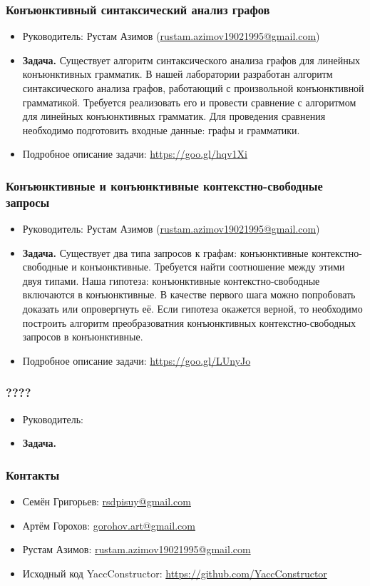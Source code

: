 \documentclass{beamer}
\begin{document}
\begin{frame}
  \transwipe[direction=90]
  \frametitle{Конъюнктивный синтаксический анализ графов}
  \begin{itemize}
    \item Руководитель: Рустам Азимов (\url{rustam.azimov19021995@gmail.com})
    \item \textbf{Задача.} 
    Существует алгоритм синтаксического анализа графов для линейных конъюнктивных грамматик. 
    В нашей лаборатории разработан алгоритм синтаксического анализа графов, работающий с произвольной конъюнктивной грамматикой.
    Требуется реализовать его и провести сравнение с алгоритмом для линейных конъюнктивных грамматик. 
    Для проведения сравнения необходимо подготовить входные данные: графы и грамматики.
    \item Подробное описание задачи: \url{https://goo.gl/hqv1Xi}
  \end{itemize}
\end{frame}

\begin{frame}
  \transwipe[direction=90]
  \frametitle{Конъюнктивные и конъюнктивные контекстно-свободные запросы}
  \begin{itemize}
    \item Руководитель: Рустам Азимов (\url{rustam.azimov19021995@gmail.com})
    \item \textbf{Задача.} 
    Существует два типа запросов к графам: конъюнктивные контекстно-свободные и конъюнктивные. 
    Требуется найти соотношение между этими двуя типами.
    Наша гипотеза: конъюнктивные контекстно-свободные включаются в конъюнктивные.
    В качестве первого шага можно попробовать доказать или опровергнуть её. 
    Если гипотеза окажется верной, то необходимо построить алгоритм преобразоватния конъюнктивных контекстно-свободных запросов в конъюнктивные.
    \item Подробное описание задачи: \url{https://goo.gl/LUnyJo}
  \end{itemize}
\end{frame}


\begin{frame}
  \transwipe[direction=90]
  \frametitle{????}
  \begin{itemize}
    \item Руководитель:
    \item \textbf{Задача.}
  \end{itemize}
\end{frame}

            
\begin{frame}
\transwipe[direction=90]
\frametitle{Контакты}
\begin{itemize}
  \item Семён Григорьев: \url{rsdpisuy@gmail.com}
  \item Артём Горохов: \url{gorohov.art@gmail.com}
  \item Рустам Азимов: \url{rustam.azimov19021995@gmail.com}
  \item Исходный код YaccConstructor: \url{https://github.com/YaccConstructor}
\end{itemize}
\end{frame}
\end{document}
